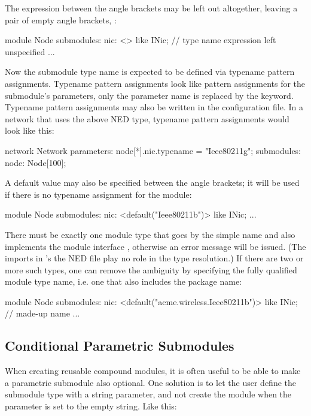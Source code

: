 The expression between the angle brackets may be left out altogether,
leaving a pair of empty angle brackets, \ttt{<>}:

\begin{ned}
module Node
{
    submodules:
        nic: <> like INic;  // type name expression left unspecified
        ...
}
\end{ned}

Now the submodule type name is expected to be defined via typename pattern
assignments. Typename pattern assignments look like pattern assignments for
the submodule's parameters, only the parameter name is replaced by the
 keyword. Typename pattern assignments may also be
written in the configuration file. In a network that uses the above
 NED type, typename pattern assignments would look like this:

\begin{ned}
network Network
{
    parameters:
        node[*].nic.typename = "Ieee80211g";
    submodules:
        node: Node[100];
}
\end{ned}

A default value may also be specified between the angle brackets;
it will be used if there is no typename assignment for the
module:

\begin{ned}
module Node
{
    submodules:
        nic: <default("Ieee80211b")> like INic;
        ...
}
\end{ned}

There must be exactly one module type that goes by the simple name 
and also implements the module interface , otherwise an error message
will be issued. (The imports in 's the NED file play no role in the
type resolution.)  If there are two or more such types, one can remove the ambiguity
by specifying the fully qualified module type name, i.e. one that also includes
the package name:

\begin{ned}
module Node
{
    submodules:
        nic: <default("acme.wireless.Ieee80211b")> like INic; // made-up name
        ...
}
\end{ned}

\subsection{Conditional Parametric Submodules}
\label{sec:ned-lang:conditional-parametric-submodules}

When creating reusable compound modules, it is often useful to be able to make a
parametric submodule also optional. One solution is to let the user define the
submodule type with a string parameter, and not create the module when the
parameter is set to the empty string. Like this:

